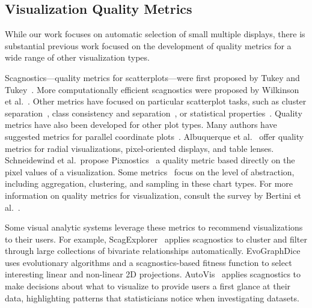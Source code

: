 \subsection{Visualization Quality Metrics}
While our work focuses on automatic selection of small multiple displays, there is substantial previous work focused on the development of quality metrics for a wide range of other visualization types. 

Scagnostics---quality metrics for scatterplots---were first proposed by Tukey and Tukey~\cite{Tukey1982, Tukey1985}. More computationally efficient scagnostics were proposed by Wilkinson et al.~\cite{Wilkinson2005, Wilkinson2008}. Other metrics have focused on particular scatterplot tasks, such as cluster separation~\cite{Sedlmair2012, Tatu2009}, class consistency and separation~\cite{Sips2009, Schafer2013}, or statistical properties~\cite{Kandel2012, Seo2005, Piringer2008}.
Quality metrics have also been developed for other plot types. Many authors have suggested metrics for parallel coordinate plots~\cite{Ankerst1998, Dasgupta2010, Johansson2009, Yang2003}. Albuquerque et al.~\cite{Albuquerque2010} offer quality metrics for radial visualizations, pixel-oriented displays, and table lenses. Schneidewind et al.\ propose Pixnostics~\cite{Schneidewind2006} a quality metric based directly on the pixel values of a visualization. Some metrics~\cite{Bertini2006, Cui2006, Yang2003} focus on the level of abstraction, including aggregation, clustering, and sampling in these chart types. For more information on quality metrics for visualization, consult the survey by Bertini et al.~\cite{Bertini2011}. 

Some visual analytic systems leverage these metrics to recommend visualizations to their users. For example, ScagExplorer~\cite{Dang2014} applies scagnostics to cluster and filter through large collections of bivariate relationships automatically.
EvoGraphDice~\cite{Boukhelifa2013} uses evolutionary algorithms and a scagnostics-based fitness function to select interesting linear and non-linear 2D projections.
AutoVis~\cite{Wills2010} applies scagnostics to make decisions about what to visualize to provide users a first glance at their data, highlighting patterns that statisticians notice when investigating datasets.


